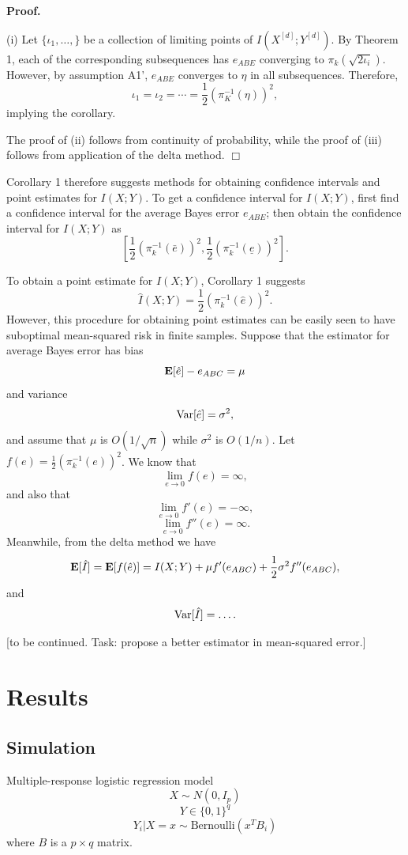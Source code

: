 \documentclass[12pt]{article}
\begin{document}
\textbf{Proof.} 

(i) Let $\{\iota_1,\hdots, \}$ be a collection of limiting points of $I(X^{[d]}; Y^{[d]})$.
By Theorem 1, each of the corresponding subsequences has $e_{ABE}$ converging to
$\pi_k(\sqrt{2 \iota_i})$.  However, by assumption A1', $e_{ABE}$ converges to $\eta$ in
all subsequences.  Therefore, 
\[\iota_1 = \iota_2 = \cdots = \frac{1}{2}(\pi_K^{-1}(\eta))^2,\]
implying the corollary.

The proof of (ii) follows from continuity of probability, while the proof of (iii) follows from application of the delta method.  $\Box$

Corollary 1 therefore suggests methods for obtaining confidence intervals and point estimates for $I(X; Y)$.
To get a confidence interval for $I(X; Y)$, first find a confidence interval for the average Bayes error $e_{ABE}$; then obtain the confidence interval for $I(X; Y)$ as
\[
[\frac{1}{2}(\pi_k^{-1}(\bar{e}))^2, \frac{1}{2}(\pi_k^{-1}(\underline{e}))^2].
\]

To obtain a point estimate for $I(X; Y)$, Corollary 1 suggests
\[\hat{I}(X; Y) = \frac{1}{2}(\pi_k^{-1}(\hat{e}))^2.\]
However, this procedure for obtaining point estimates can be easily seen to have suboptimal mean-squared risk in finite samples.
Suppose that the estimator for average Bayes error has bias
\[
\textbf{E}[\hat{e}] - e_{ABC} = \mu
\]
and variance
\[
\text{Var}[\hat{e}] = \sigma^2,
\]
and assume that $\mu$ is $O(1/\sqrt{n})$ while $\sigma^2$ is $O(1/n)$.
Let $f(e) = \frac{1}{2}(\pi_k^{-1}(e))^2$.
We know that
\[
\lim_{e \to 0} f(e) = \infty,
\]
and also that
\[
\lim_{e \to 0} f'(e) = -\infty,
\]
\[
\lim_{e \to 0} f''(e) = \infty.
\]
Meanwhile, from the delta method we have
\[
\textbf{E}[\hat{I}] = \textbf{E}[f(\hat{e})] = I(X; Y) + \mu f'(e_{ABC}) + \frac{1}{2} \sigma^2 f''(e_{ABC}),
\]
and
\[
\text{Var}[\hat{I}] = \hdots.
\]

[to be continued.  Task: propose a better estimator in mean-squared error.]

\section{Results}

\subsection{Simulation}

Multiple-response logistic regression model
\[
X \sim N(0, I_p)
\]
\[
Y \in \{0,1\}^q
\]
\[
Y_i|X = x \sim \text{Bernoulli}(x^T B_i)
\]
where $B$ is a $p \times q$ matrix.
\end{document}
